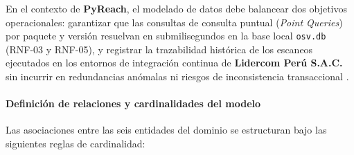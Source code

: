 En el contexto de \textbf{PyReach}, el modelado de datos debe balancear dos objetivos operacionales: garantizar que las consultas de consulta puntual (\textit{Point Queries}) por paquete y versión resuelvan en submilisegundos en la base local \texttt{osv.\allowbreak db} (RNF-03 y RNF-05), y registrar la trazabilidad histórica de los escaneos ejecutados en los entornos de integración continua de \textbf{Lidercom Perú S.A.C.} sin incurrir en redundancias anómalas ni riesgos de inconsistencia transaccional \cite{openssf2023osv, torres2026proyecto}.

\paragraph*{Definición de relaciones y cardinalidades del modelo}
Las asociaciones entre las seis entidades del dominio se estructuran bajo las siguientes reglas de cardinalidad:

